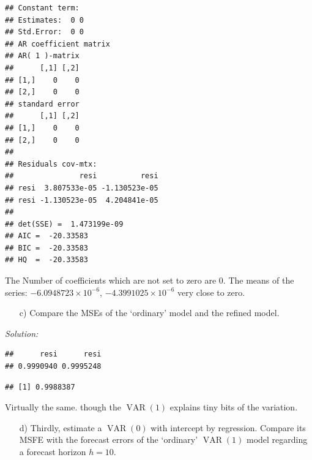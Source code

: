 \documentclass[12pt,a4paper]{article}
\newcommand{\VAR}{\operatorname{VAR}} %
\newenvironment{Shaded}{\begin{snugshade}}{\end{snugshade}}
\newcommand{\KeywordTok}[1]{\textcolor[rgb]{0.13,0.29,0.53}{\textbf{#1}}}
\newcommand{\NormalTok}[1]{#1}
\newcommand{\OperatorTok}[1]{\textcolor[rgb]{0.81,0.36,0.00}{\textbf{#1}}}
\newcommand{\StringTok}[1]{\textcolor[rgb]{0.31,0.60,0.02}{#1}}
\begin{document}
\begin{verbatim}
## Constant term: 
## Estimates:  0 0 
## Std.Error:  0 0 
## AR coefficient matrix 
## AR( 1 )-matrix 
##      [,1] [,2]
## [1,]    0    0
## [2,]    0    0
## standard error 
##      [,1] [,2]
## [1,]    0    0
## [2,]    0    0
##   
## Residuals cov-mtx: 
##               resi          resi
## resi  3.807533e-05 -1.130523e-05
## resi -1.130523e-05  4.204841e-05
##   
## det(SSE) =  1.473199e-09 
## AIC =  -20.33583 
## BIC =  -20.33583 
## HQ  =  -20.33583
\end{verbatim}

The Number of coefficients which are not set to zero are 0. The means of
the series: \ensuremath{-6.0948723\times 10^{-6}},
\ensuremath{-4.3991025\times 10^{-6}} very close to zero.

\begin{itemize}
  \item[c)] Compare the MSEs of the ‘ordinary’ model and the refined model.
\end{itemize}

\emph{Solution:}

\begin{Shaded}
\end{Shaded}

\begin{verbatim}
##      resi      resi 
## 0.9990940 0.9995248
\end{verbatim}

\begin{Shaded}
\end{Shaded}

\begin{verbatim}
## [1] 0.9988387
\end{verbatim}

Virtually the same. though the \(\VAR(1)\) explains tiny bits of the
variation.

\begin{itemize}
  \item[d)] Thirdly, estimate a $\VAR(0)$ with intercept by regression. Compare its MSFE with the forecast errors of the ‘ordinary’ $\VAR(1)$ model regarding a forecast horizon $h = 10$.
\end{itemize}
\end{document}
